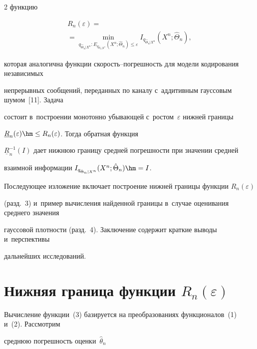 \begin{multicols}{2}
функцию 


\begin{multline}


R_n(\varepsilon) ={}\\


{}= \min\limits_{q_{\hat{\Theta}_n\vert X^n}: E_{q_{\hat{\Theta}_n\vert X^n}} 


(X^n;\hat{\Theta}_n)\leq \varepsilon} I_{q_{\hat{\Theta}_n\vert X^n}} (X^n; \hat{\Theta}_n),


\label{e3-lan}


\end{multline}


которая аналогична функции ско\-рость--по\-греш\-ность для модели кодирования независимых 


непрерывных сообщений, переданных по каналу с~аддитивным гауссовым шумом~[11]. Задача 


состоит в~построении монотонно убывающей с~рос\-том~$\varepsilon$ нижней границы 


$\underline{R}_n (\varepsilon) \hm\leq R_n(\varepsilon)$. Тогда обратная функция 


$\underline{R}_n^{-1}(I)$ дает ниж\-нюю границу сред\-ней по\-греш\-ности при значении сред\-ней 


взаимной информации $I_{q_{\hat{\Theta}_n\vert X^n}}(X^n; \hat{\Theta}_n)\hm=I$. 





Последующее изложение включает построение нижней границы функции $R_n(\varepsilon)$ 


(разд.~3) и~пример вы\-чис\-ле\-ния найденной границы в~случае оценивания сред\-не\-го значения 


гауссовой плот\-ности (разд.~4). Заключение содержит краткие выводы и~перспективы 


дальнейших исследований.





\section{Нижняя граница функции $R_n(\varepsilon)$}





Вычисление функции~(3) базируется на преобразованиях функционалов~(1) и~(2). Рассмотрим 


сред\-нюю по\-греш\-ность оценки~$\hat{\theta}_n$ 



\end{multicols}
